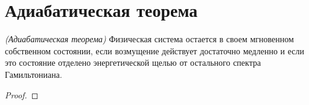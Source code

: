 \section{Адиабатическая теорема}

\begin{theorem}
\emph{(Адиабатическая теорема)}
\label{addQAdiabatic}
Физическая система остается в своем мгновенном собственном состоянии,
если возмущение действует достаточно медленно и если это состояние
отделено энергетической щелью от остального спектра Гамильтониана.
\end{theorem}

\begin{proof}
\end{proof}
